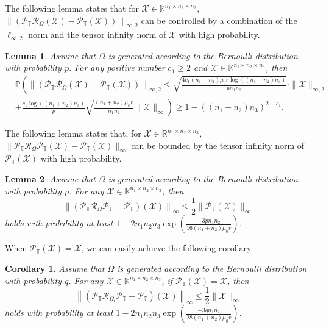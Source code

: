 \documentclass[twoside,12pt]{article}
\newtheorem{lemma}{Lemma}
\newtheorem{corollary}{Corollary}
\newcommand{\lx}[1]{\textcolor{pink}{#1}}
\begin{document}
The following lemma states that for $\mathcal{X}\in\mathbb{K}^{n_1\times n_2\times n_3}$, $\left\|(\mathcal{P}_{\mathbb{T}}\mathcal{R}_{\Omega}(\mathcal{X})-\mathcal{P}_{\mathbb{T}}(\mathcal{X}))\right\|_{\infty,2}$ can be controlled by a combination of the $\ell_{\infty,2}$ norm  and the tensor infinity norm of $\mathcal{X}$ with high probability.
 
\begin{lemma}\label{conditionII2}\rm
Assume that $\Omega$ is generated according to the Bernoulli distribution with probability $p$.
For any positive number  $c_1 \geq 2$ and $\mathcal{X}\in\mathbb{K}^{n_1\times n_2\times n_3}$, then  
\begin{align*}
&\mathbb{P}\left(\left\|(\mathcal{P}_{\mathbb{T}}\mathcal{R}_{\Omega}(\mathcal{X})-\mathcal{P}_{\mathbb{T}}(\mathcal{X}))\right\|_{\infty,2}\leq\sqrt{\frac{4c_1(n_{1}+n_{2})\mu_{0}r\log\left((n_1+n_2)n_3\right)}{pn_{1}n_{2}}}\cdot\|\mathcal{X}\|_{\infty,2}   \right.\\
&+\left.\frac{c_1\log((n_1+n_2)n_3)}{p}\sqrt{\frac{(n_1+n_2)\mu_{0}r}{n_{1}n_{2}}}\|\mathcal{X}\|_{\infty}\right)\geq 1-((n_1+n_2)n_3)^{2-c_1}.
\end{align*} 
\end{lemma}
The following lemma states that, for $\mathcal{X}\in \mathbb{R}^{n_1\times n_2\times n_3}$,  $\|\mathcal{P}_{\mathbb{T}} \mathcal{R}_{\Omega} \mathcal{P}_{\mathbb{T}}(\mathcal{X})-\mathcal{P}_{\mathbb{T}}(\mathcal{X})\|_{\infty}$ can be bounded by the tensor infinity norm of $\mathcal{P}_{\mathbb{T}}(\mathcal{X})$ with high probability.
\begin{lemma}\label{conditionII3}\rm
Assume that $\Omega$ is generated according to the Bernoulli distribution with probability $p$.
For any $\mathcal{X}\in \mathbb{K}^{n_1\times n_2\times n_3}$,  then
$$
\left\|\left(\mathcal{P}_{\mathbb{T}} \mathcal{R}_{\Omega} \mathcal{P}_{\mathbb{T}}-\mathcal{P}_{\mathbb{T}}\right)(\mathcal{X})\right\|_{\infty} \leq \frac{1}{2}\|\mathcal{P}_{\mathbb{T}}(\mathcal{X})\|_{\infty}
$$
holds with probability at least $1-2n_{1}n_{2}n_{3}\exp\left(\frac{-3pn_{1}n_{2}}{16(n_1+n_2)\mu_{0}r}\right)$.
\end{lemma}
 {When $\mathcal{P}_{\mathbb{T}}(\mathcal{X})=\mathcal{X}$, we can easily achieve the following corollary. }
\begin{corollary} \label{conditionII33}\rm 
Assume that $\Omega$ is generated according to the Bernoulli distribution with probability $q$. For any $\mathcal{X}\in \mathbb{K}^{n_1\times n_2\times n_3}$, if $\mathcal{P}_{\mathbb{T}}(\mathcal{X}) = \mathcal{X}$, then
$$
\left\|\left(\mathcal{P}_{\mathbb{T}} \mathcal{R}_{\Omega_{t}} \mathcal{P}_{\mathbb{T}}-\mathcal{P}_{\mathbb{T}}\right)(\mathcal{X})\right\|_{\infty} \leq \frac{1}{2}\|\mathcal{X}\|_{\infty}
$$
holds with probability at least $1-2n_{1}n_{2}n_{3}\exp\left(\frac{-3qn_{1}n_{2}}{28(n_1+n_2)\mu_{0}r}\right)$.
\end{corollary}
\end{document}
